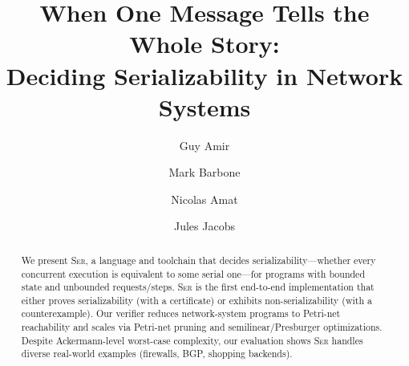 \documentclass[a4paper]{llncs}
\title{When One Message Tells the Whole Story:\\ Deciding Serializability in Network Systems}
\author{
			Guy Amir \and
			Mark Barbone \and
			Nicolas Amat \and
			Jules Jacobs
		}
\institute{}
\newcommand{\toolname}{\textsc{Ser}}
\let\oldmaketitle\maketitle
\renewcommand{\maketitle}{
  \oldmaketitle
  \pagestyle{plain}  %
  \thispagestyle{plain}  %
}
\begin{document}
\raggedbottom


%	

\maketitle

\begin{abstract}
We present \toolname{}, a language and toolchain that decides serializability—whether every concurrent execution is equivalent to some serial one—for programs with bounded state and unbounded requests/steps.
\toolname{} is the first end-to-end implementation that either proves serializability (with a certificate) or exhibits non-serializability (with a counterexample).
Our verifier reduces network-system programs to Petri-net reachability and scales via Petri-net pruning and semilinear/Presburger optimizations.
Despite Ackermann-level worst-case complexity, our evaluation shows \toolname{} handles diverse real-world examples (firewalls, BGP, shopping backends).
\end{abstract}











\newpage

{

	
}

\newpage










\end{document}
